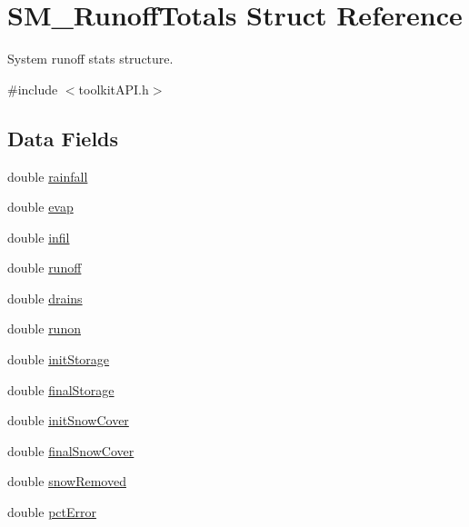 \hypertarget{struct_s_m___runoff_totals}{}\section{S\+M\+\_\+\+Runoff\+Totals Struct Reference}
\label{struct_s_m___runoff_totals}


System runoff stats structure.  




{\ttfamily \#include $<$toolkit\+A\+P\+I.\+h$>$}

\subsection*{Data Fields}
\begin{DoxyCompactItemize}
\item 
double \mbox{\hyperlink{struct_s_m___runoff_totals_a9e7224629321a940c1f8f9a64e73a588}{rainfall}}
\item 
double \mbox{\hyperlink{struct_s_m___runoff_totals_aac3c1df7592191453d2ff02e5ff1b7e6}{evap}}
\item 
double \mbox{\hyperlink{struct_s_m___runoff_totals_a6cd5b8d39e713bd1618a254d53def9b2}{infil}}
\item 
double \mbox{\hyperlink{struct_s_m___runoff_totals_a4dcd362194c38698fe8f5b2659ba2dc6}{runoff}}
\item 
double \mbox{\hyperlink{struct_s_m___runoff_totals_aee262996ca8263b6f94774a0c337ddb4}{drains}}
\item 
double \mbox{\hyperlink{struct_s_m___runoff_totals_ac05f157303936535978c7e69f6dfb16f}{runon}}
\item 
double \mbox{\hyperlink{struct_s_m___runoff_totals_add0f27c9cc788302f259ee9a4c9b2f48}{init\+Storage}}
\item 
double \mbox{\hyperlink{struct_s_m___runoff_totals_ae2e8a073faa2b013982ffc0fedf9e376}{final\+Storage}}
\item 
double \mbox{\hyperlink{struct_s_m___runoff_totals_ae3c3a619de037ede60b6ad04b80ae3dc}{init\+Snow\+Cover}}
\item 
double \mbox{\hyperlink{struct_s_m___runoff_totals_a50e84cf1314dcc39864c68c3ad316055}{final\+Snow\+Cover}}
\item 
double \mbox{\hyperlink{struct_s_m___runoff_totals_ad3b23dfe7238169f9f3a0530fba2ba39}{snow\+Removed}}
\item 
double \mbox{\hyperlink{struct_s_m___runoff_totals_a061bfec118db4216f0062258ce029ec2}{pct\+Error}}
\end{DoxyCompactItemize}


